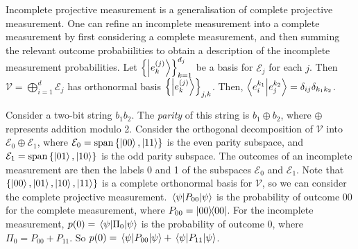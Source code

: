 Incomplete projective measurement is a generalisation of complete projective measurement.
One can refine an incomplete measurement into a complete measurement by first considering a complete measurement, and then summing the relevant outcome probabiilities to obtain a description of the incomplete measurement probabilities.
Let \( \qty{\ket{e_k^{(j)}}}_{k=1}^{d_j} \) be a basis for \( \mathcal E_j \) for each \( j \).
Then \( \mathcal V = \bigoplus_{i=1}^d \mathcal E_j \) has orthonormal basis \( \qty{\ket{e_k^{(j)}}}_{j,k} \).
Then, \( \ip{e_i^{k_1}}{e_j^{k_2}} = \delta_{ij} \delta_{k_1 k_2} \).

Consider a two-bit string \( b_1 b_2 \).
The \emph{parity} of this string is \( b_1 \oplus b_2 \), where \( \oplus \) represents addition modulo 2.
Consider the orthogonal decomposition of \( \mathcal V \) into \( \mathcal E_0 \oplus \mathcal E_1 \), where \( \mathcal E_0 = \operatorname{span} \qty{\ket{00}, \ket{11}} \) is the even parity subspace, and \( \mathcal E_1 = \operatorname{span} \qty{\ket{01}, \ket{10}} \) is the odd parity subspace.
The outcomes of an incomplete measurement are then the labels 0 and 1 of the subspaces \( \mathcal E_0 \) and \( \mathcal E_1 \).
Note that \( \qty{\ket{00}, \ket{01}, \ket{10}, \ket{11}} \) is a complete orthonormal basis for \( \mathcal V \), so we can consider the complete projective measurement.
\( \ev{P_{00}}{\psi} \) is the probability of outcome \( 00 \) for the complete measurement, where \( P_{00} = \op{00}{00} \).
For the incomplete measurement, \( p(0) = \ev{\Pi_0}{\psi} \) is the probability of outcome 0, where \( \Pi_0 = P_{00} + P_{11} \).
So \( p(0) = \ev{P_{00}}{\psi} + \ev{P_{11}}{\psi} \).


